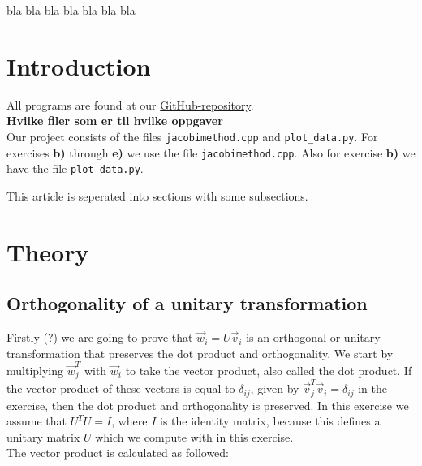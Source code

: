 \documentclass{article}
\begin{document}
bla bla bla bla bla bla bla




\vspace{1cm}

\section{Introduction} \label{sec:Introduction}

All programs are found at our \href{https://github.com/Erikbgram/Fys3150}{GitHub-repository}. \\

\textbf{Hvilke filer som er til hvilke oppgaver} \\

Our project consists of the files \texttt{jacobimethod.cpp} and \texttt{plot\_data.py}. For exercises \textbf{b)} through \textbf{e)} we use the file \texttt{jacobimethod.cpp}. Also for exercise \textbf{b)} we have the file \texttt{plot\_data.py}.

This article is seperated into sections with some subsections.

\vspace{1cm}

\section{Theory} \label{sec:Theory}

\subsection{Orthogonality of a unitary transformation} \label{sec:orthogonality}

Firstly (?) we are going to prove that $\vec{w}_i = U \vec{v}_i$ is an orthogonal or unitary transformation that preserves the dot product and orthogonality. We start by multiplying $\vec{w}_j ^T$ with $\vec{w}_i$ to take the vector product, also called the dot product. If the vector product of these vectors is equal to $\delta_{ij}$, given by $\vec{v}_j ^T \vec{v}_i = \delta_{ij}$ in the exercise, then the dot product and orthogonality is preserved. In this exercise we assume that $U^T U = I$, where $I$ is the identity matrix, because this defines a unitary matrix $U$ which we compute with in this exercise. \\

The vector product is calculated as followed:
\end{document}
